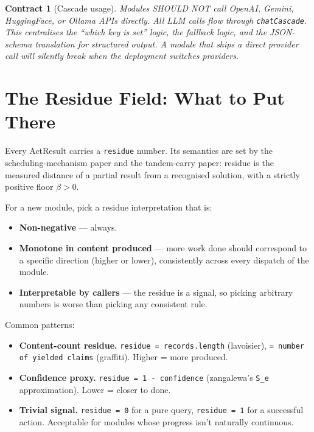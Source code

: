 \documentclass[11pt,a4paper]{article}
\theoremstyle{contract}
\newtheorem{contract}{Contract}[section]
\begin{document}
\begin{contract}[Cascade usage]
\label{contract:cascade}
Modules SHOULD NOT call OpenAI, Gemini, HuggingFace, or Ollama APIs
directly. All LLM calls flow through \texttt{chatCascade}. This
centralises the ``which key is set'' logic, the fallback logic, and the
JSON-schema translation for structured output. A module that ships a
direct provider call will silently break when the deployment switches
providers.
\end{contract}

\section{The Residue Field: What to Put There}
\label{sec:residue}

Every ActResult carries a \texttt{residue} number. Its semantics are set
by the scheduling-mechanism paper and the tandem-carry paper: residue is
the measured distance of a partial result from a recognised solution,
with a strictly positive floor $\beta > 0$.

For a new module, pick a residue interpretation that is:

\begin{itemize}[nosep,leftmargin=1.4em]
\item \textbf{Non-negative} --- always.
\item \textbf{Monotone in content produced} --- more work done should
correspond to a specific direction (higher or lower), consistently
across every dispatch of the module.
\item \textbf{Interpretable by callers} --- the residue is a signal, so
picking arbitrary numbers is worse than picking any consistent rule.
\end{itemize}

Common patterns:

\begin{itemize}[nosep,leftmargin=1.4em]
\item \textbf{Content-count residue.} \texttt{residue = records.length}
(lavoisier), \texttt{= number of yielded claims} (graffiti). Higher =
more produced.
\item \textbf{Confidence proxy.} \texttt{residue = 1 - confidence}
(zangalewa's \texttt{S\_e} approximation). Lower = closer to done.
\item \textbf{Trivial signal.} \texttt{residue = 0} for a pure query,
\texttt{residue = 1} for a successful action. Acceptable for modules
whose progress isn't naturally continuous.
\end{itemize}
\end{document}
